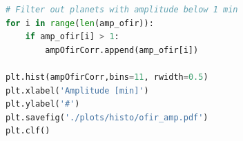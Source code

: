 \documentclass[12pt]{report}
\begin{document}
\begin{appendix}
\begin{lstlisting}[language=Python]
# Filter out planets with amplitude below 1 min
for i in range(len(amp_ofir)):
	if amp_ofir[i] > 1:
		ampOfirCorr.append(amp_ofir[i])

plt.hist(ampOfirCorr,bins=11, rwidth=0.5)
plt.xlabel('Amplitude [min]')
plt.ylabel('#')
plt.savefig('./plots/histo/ofir_amp.pdf')
plt.clf()	
\end{lstlisting}
\end{appendix}
\end{document}
